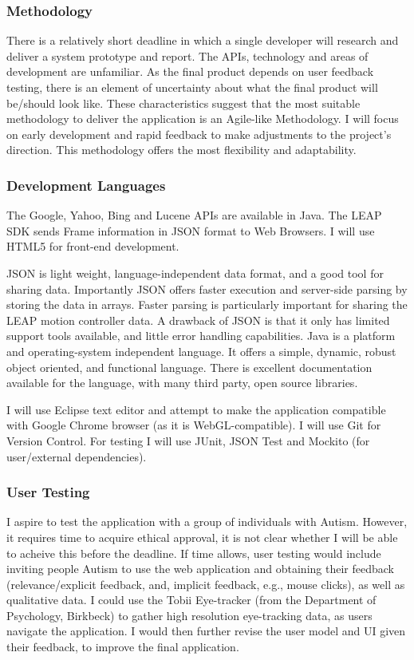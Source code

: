 \documentclass[a4paper, 10pt]{article}
\begin{document}
\subsubsection{Methodology}
There is a relatively short deadline in which a single developer will research and deliver a system prototype and report. The APIs, technology and areas of development are unfamiliar. As the final product depends on user feedback testing, there is an element of uncertainty about what the final product will be/should look like. These characteristics suggest that the most suitable methodology to deliver the application is an Agile-like Methodology. I will focus on early development and rapid feedback to make adjustments to the project's direction. This methodology offers the most flexibility and adaptability.


\subsubsection{Development Languages}
The Google, Yahoo, Bing and Lucene APIs are available in Java. The LEAP SDK sends Frame information in JSON format to Web Browsers. I will use HTML5 for front-end development.

JSON is light weight, language-independent data format, and a good tool for sharing data. Importantly JSON offers faster execution and server-side parsing by storing the data in arrays. Faster parsing is particularly important for sharing the LEAP motion controller data. A drawback of JSON is that it only has limited support tools available, and little error handling capabilities. Java is a platform and operating-system independent language. It offers a simple, dynamic, robust object oriented, and functional language. There is excellent documentation available for the language, with many third party, open source libraries.

I will use Eclipse text editor and attempt to make the application compatible with Google Chrome browser (as it is WebGL-compatible). I will use Git for Version Control. For testing I will use JUnit, JSON Test and Mockito (for user/external dependencies).

\subsubsection{User Testing}
I aspire to test the application with a group of individuals with Autism. However, it requires time to acquire ethical approval, it is not clear whether I will be able to acheive this before the deadline. If time allows, user testing would include inviting people Autism to use the web application and obtaining their feedback (relevance/explicit feedback, and, implicit feedback, e.g., mouse clicks), as well as qualitative data. I could use the Tobii Eye-tracker (from the Department of Psychology, Birkbeck) to gather high resolution eye-tracking data, as users navigate the application. I would then further revise the user model and UI given their feedback, to improve the final application.
\end{document}
